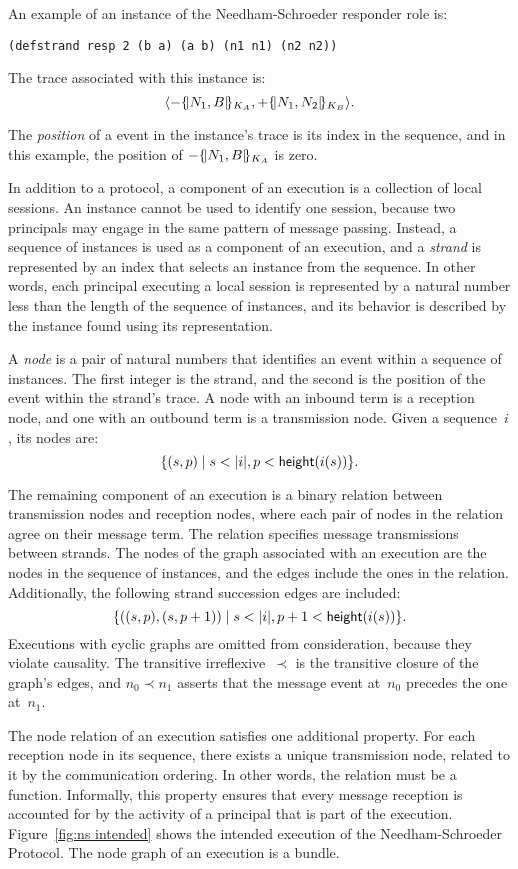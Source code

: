 \documentclass[12pt]{article}
\begin{document}
An example of an instance of the Needham-Schroeder responder role
is:
\begin{center}
\texttt{(defstrand resp 2 (b a) (a b) (n1 n1) (n2 n2))}
\end{center}
The trace associated with this instance is:
$$\langle\mathord -\{\!|N_1, B|\!\}_{K_A}, \mathord +\{\!|N_1,
N_2|\!\}_{K_B}\rangle.$$

The \emph{position} of a event in the
instance's trace is its index in the sequence, and in this example,
the position of $\mathord -\{\!|N_1, B|\!\}_{K_A}$ is zero.

In addition to a protocol, a component of an execution is a collection
of local sessions.  An instance cannot be used to identify one
session, because two principals may engage in the same pattern of
message passing.  Instead, a sequence of instances is used as a
component of an execution, and a \emph{strand} is represented by an
index that selects an instance from the sequence.  In other words,
each principal executing a local session is represented by a natural
number less than the length of the sequence of instances, and its
behavior is described by the instance found using its representation.

A \emph{node} is a pair of natural numbers that identifies
an event within a sequence of instances.  The first integer is
the strand, and the second is the position of the event within
the strand's trace.  A node with an inbound term is a reception
node, and one with an outbound term is a
transmission node.  Given a sequence~$i$, its
nodes are: $$\{(s,p)\mid s<|i|, p<\cn{height}(i(s))\}.$$

The remaining component of an execution is a binary relation between
transmission nodes and reception nodes, where each pair of nodes in
the relation agree on their message term.  The relation specifies
message transmissions between strands.  The nodes of the graph
associated with an execution are the nodes in the sequence of
instances, and the edges include the ones in the relation.
Additionally, the following strand succession edges are included: $$\{((s,p), (s, p+1))\mid s<|i|,
p+1<\cn{height}(i(s))\}.$$ Executions with cyclic graphs are omitted
from consideration, because they violate causality.  The transitive
irreflexive~$\prec$ is the transitive closure of the graph's edges,
and $n_0\prec n_1$ asserts that the message event at~$n_0$ precedes
the one at~$n_1$.

The node relation of an execution satisfies one additional property.
For each reception node in its sequence, there exists a unique
transmission node, related to it by the communication ordering.  In
other words, the relation must be a function.  Informally, this
property ensures that every message reception is accounted for by the
activity of a principal that is part of the execution.
Figure~\ref{fig:ns intended} shows the intended execution of the
Needham-Schroeder Protocol.  The node graph of an execution is a
bundle.
\end{document}
